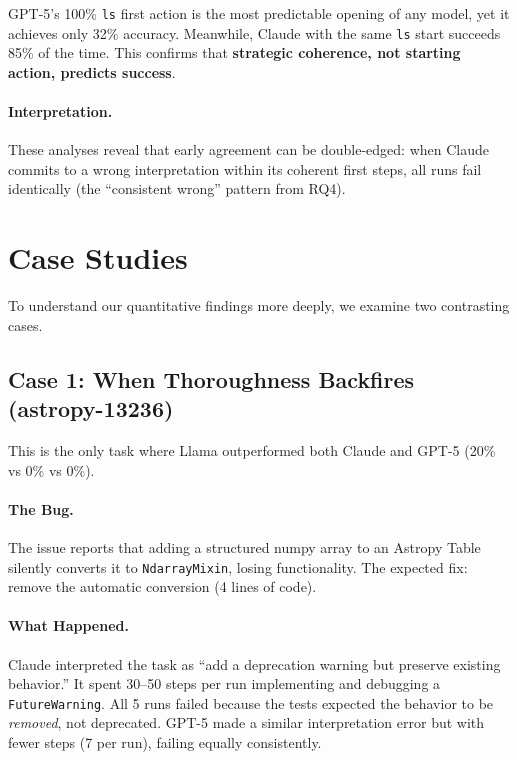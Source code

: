 \documentclass{article}
\begin{document}
GPT-5's 100\% \texttt{ls} first action is the most predictable opening of any model, yet it achieves only 32\% accuracy. Meanwhile, Claude with the same \texttt{ls} start succeeds 85\% of the time. This confirms that \textbf{strategic coherence, not starting action, predicts success}.

\paragraph{Interpretation.} These analyses reveal that early agreement can be double-edged: when Claude commits to a wrong interpretation within its coherent first steps, all runs fail identically (the ``consistent wrong'' pattern from RQ4).

\section{Case Studies}
\label{sec:casestudy}

To understand our quantitative findings more deeply, we examine two contrasting cases.

\subsection{Case 1: When Thoroughness Backfires (astropy-13236)}

This is the only task where Llama outperformed both Claude and GPT-5 (20\% vs 0\% vs 0\%).

\paragraph{The Bug.} The issue reports that adding a structured numpy array to an Astropy Table silently converts it to \texttt{NdarrayMixin}, losing functionality. The expected fix: remove the automatic conversion (4 lines of code).

\paragraph{What Happened.} Claude interpreted the task as ``add a deprecation warning but preserve existing behavior.'' It spent 30--50 steps per run implementing and debugging a \texttt{FutureWarning}. All 5 runs failed because the tests expected the behavior to be \textit{removed}, not deprecated. GPT-5 made a similar interpretation error but with fewer steps (7 per run), failing equally consistently.
\end{document}
